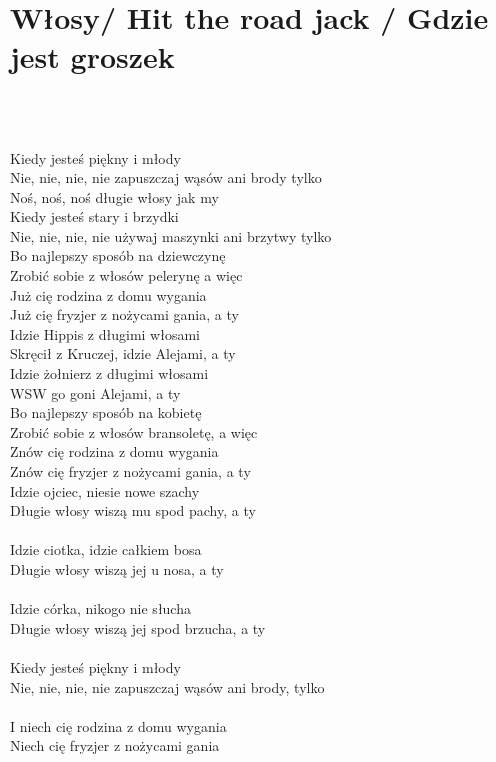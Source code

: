 \documentclass[a5paper, 10pt]{book}
\begin{document}
\section{Włosy/ Hit the road jack / Gdzie jest groszek}\textcolor{lightgray}{\textit{}}\\~\\
\begin{minipage}[t]{0.8\textwidth}
Kiedy jesteś piękny i młody\\
Nie, nie, nie, nie zapuszczaj wąsów ani brody tylko\\

\hspace*{5mm}Noś, noś, noś długie włosy jak my\\

Kiedy jesteś stary i brzydki\\
Nie, nie, nie, nie używaj maszynki ani brzytwy tylko\\

Bo najlepszy sposób na dziewczynę\\
Zrobić sobie z włosów pelerynę a więc\\

Już cię rodzina z domu wygania\\
Już cię fryzjer z nożycami gania, a ty\\

Idzie Hippis z długimi włosami\\
Skręcił z Kruczej, idzie Alejami, a ty\\

Idzie żołnierz z długimi włosami\\
WSW go goni Alejami, a ty\\

Bo najlepszy sposób na kobietę\\
Zrobić sobie z włosów bransoletę, a więc\\

Znów cię rodzina z domu wygania\\
Znów cię fryzjer z nożycami gania, a ty\\

Idzie ojciec, niesie nowe szachy\\
Długie włosy wiszą mu spod pachy, a ty\\
\\
Idzie ciotka, idzie całkiem bosa\\
Długie włosy wiszą jej u nosa, a ty\\
\\
Idzie córka, nikogo nie słucha\\
Długie włosy wiszą jej spod brzucha, a ty\\
\\
Kiedy jesteś piękny i młody\\
Nie, nie, nie, nie zapuszczaj wąsów ani brody, tylko\\
\\
I niech cię rodzina z domu wygania\\
Niech cię fryzjer z nożycami gania\\
\\
\end{minipage}
\end{document}
